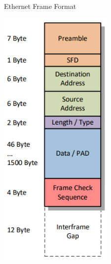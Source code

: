 \begin{definition}{Ethernet Frame Format}\\
    \begin{minipage}{0.3\linewidth}
        \includegraphics[width=0.9\linewidth]{images/ethernet_format.png}

\end{minipage}
\end{definition}
